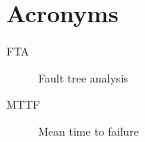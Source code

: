 
\chapter{Acronyms}
\begin{description}
\item[FTA] Fault tree analysis
\item[MTTF] Mean time to failure
\end{description}

